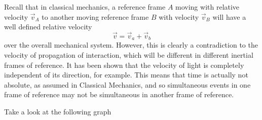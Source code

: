 \documentclass{article}
\begin{document}
			Recall that in classical mechanics, a reference frame $A$ moving with relative velocity $\vec{v}_A$ to another moving reference frame $B$ with velocity $\vec{v}_B$ will have a well defined relative velocity
			$$ \vec{v} = \vec{v}_a + \vec{v}_b$$
			over the overall mechanical system. However, this is clearly a contradiction to the velocity of propagation of interaction, which will be different in different inertial frames of reference. It has been shown that the velocity of light is completely independent of its direction, for example. This means that time is actually not absolute, as assumed in Classical Mechanics, and so simultaneous events in one frame of reference may not be simultaneous in another frame of reference.
			\begin{exmp}
				Take a look at the following graph
				\begin{figure}[h]
				\end{figure}
			
			\end{exmp}
			
			
			
			
\end{document}
